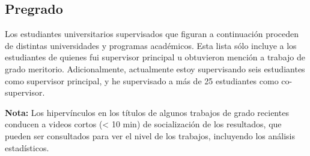 \documentclass[11pt,a4paper,]{awesome-cv}
\begin{document}
\hypertarget{section-1}{%
\subsection{\texorpdfstring{\textbf{Pregrado}}{}}\label{section-1}}

\begin{footnotesize}
Los estudiantes universitarios supervisados que figuran a continuación proceden de distintas universidades y programas académicos. Esta lista sólo incluye a los estudiantes de quienes fui supervisor principal u obtuvieron mención a trabajo de grado meritorio. Adicionalmente, actualmente estoy supervisando seis estudiantes como supervisor principal, y he supervisado a más de 25 estudiantes como co-supervisor.

\textbf{Nota:} Los hipervínculos en los títulos de algunos trabajos de grado recientes conducen a videos cortos (< 10 min) de socialización de los resultados, que pueden ser consultados para ver el nivel de los trabajos, incluyendo los análisis estadísticos.
\end{footnotesize}
\end{document}
